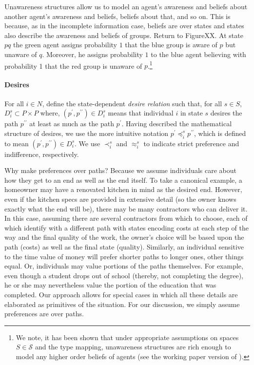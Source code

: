 \documentclass[
11pt,
titlepage,
reqno,
]{article}%
\theoremstyle{definition}
\begin{document}
Unawareness structures allow us to model an agent's awareness and beliefs about another agent's awareness and beliefs, beliefs about that, and so on. This is because, as in the incomplete information case,  beliefs are over states and states also describe the awareness and beliefs of groups.  Return to FigureXX. At state $pq$ the green agent assigns probability $1$ that the blue group is aware of $p$ but unaware of $q$. Moreover, he assigns probability $1$ to the blue agent believing with probability 1 that the red group is unaware of $p$.\footnote{We  note, it has been shown that under appropriate assumptions on spaces $S \in \mathcal{S}$ and the type mapping, unawareness structures are rich enough to model any higher order beliefs of agents (see the working paper version of \citet{Heifetz2013}).}
	
\paragraph{Desires \label{para: desires}}
	For all $i\in N$, define the state-dependent \textit{desire relation} such that, for all $s\in S$,   $D_i^s\subset P\times P$ where, $(p^\prime,p^{\prime\prime})\in D_i^s$ means that  individual $i$ in state $s$ desires the path $p^{\prime\prime}$ at least as much as the path $p^\prime$. 
	Having described the mathematical structure of desires, we use the more intuitive notation $p^\prime\preceq_i^s p^{\prime\prime}$, which is defined to mean $(p^\prime,p^{\prime\prime})\in D_i^s$. 
	We use $\prec_i^s$ and $\approx_i^s$ to indicate strict preference and indifference, respectively. 
	
	Why make preferences over paths? Because we assume individuals care about how they get to an end as well as the end itself. 
	To take a canonical example, a homeowner may have a renovated kitchen in mind as the desired end. 
	However, even if the kitchen specs are provided in extensive detail (so the owner knows exactly what the end will be), there may be many contractors who can deliver it. 
	In this case, assuming there are several contractors from which to choose, each of which identify with a different path with states encoding costs  at each step of the way and the final quality of the work, the owner's choice will be based upon the path (costs) as well as the final state (quality). 
	Similarly, an individual sensitive to the time value of money will prefer shorter paths to longer ones, other things equal. 
	Or, individuals may value portions of the paths themselves.
	For example, even though a student drops out of school (thereby, not completing the degree), he or she may nevertheless value the portion of the education that was completed. 
	Our approach allows for special cases in which all these details are elaborated as primitives of the situation. For our discussion, we simply assume preferences are over paths.    %
	
\end{document}
